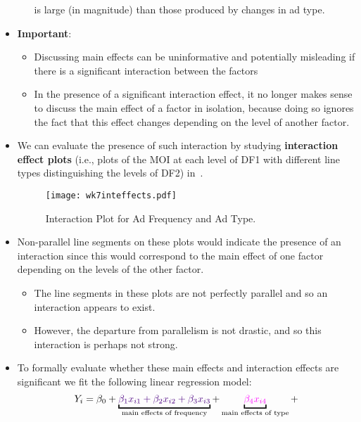 \begin{itemize}
\begin{itemize}
                        is large (in magnitude) than those produced by changes in ad type.
            \end{itemize}
      \item \textbf{Important}:
            \begin{itemize}
                  \item Discussing main effects can be uninformative and potentially misleading if there is a significant
                        interaction between the factors
                  \item In the presence of a significant interaction effect, it no longer makes sense to discuss the main
                        effect of a factor in isolation, because doing so ignores the fact that this effect changes depending
                        on the level of another factor.
            \end{itemize}
      \item We can evaluate the presence of such interaction by studying \textbf{interaction effect plots} (i.e., plots of the MOI at each
            level of DF1 with different line types distinguishing the levels of DF2) in~.
            \begin{figure}[!htbp]
                  \centering
                  \texttt{[image: wk7inteffects.pdf]}
                  \caption{Interaction Plot for Ad Frequency and Ad Type.}\label{wk7int}
            \end{figure}
      \item Non-parallel line segments on these plots would indicate the presence of an interaction since this would
            correspond to the main effect of one factor depending on the levels of the other factor.
            \begin{itemize}
                  \item The line segments in these plots are not perfectly parallel and so an interaction appears to exist.
                  \item However, the departure from parallelism is not drastic, and so this interaction is perhaps not strong.
            \end{itemize}
      \item To formally evaluate whether these main effects and interaction effects are significant we fit the following
            linear regression model:
            \[ Y_i=\beta_0+\underbracket{\textcolor{Indigo}{\beta_1x_{i1}+\beta_2x_{i2}+\beta_3x_{i3}}}_{\text{main effects of frequency}}+\underbracket{\textcolor{Fuchsia}{\beta_4x_{i4}}}_{\text{main effects of type}}+
\]
\end{itemize}
